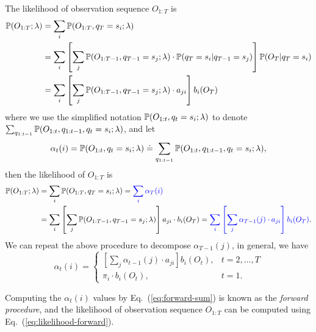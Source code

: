 The likelihood of observation sequence $O_{1:T}$ is
\begin{align*}
\mathbb{P}(O_{1:T} ;\lambda) 
&= \sum_{i} \mathbb{P}(O_{1:T}, q_T = s_i ;\lambda) \\
&= \sum_{i} \left[ \sum_{j} \mathbb{P}(O_{1:T-1}, q_{T-1} = s_j ;\lambda) \cdot \mathbb{P}(q_T = s_i |q_{T-1} = s_j) \right] \mathbb{P}(O_T |q_T = s_i) \\
&= \sum_{i} \left[ \sum_{j} \mathbb{P}(O_{1:T-1}, q_{T-1} = s_j ;\lambda) \cdot a_{ji} \right] b_i(O_T)
\end{align*}
where we use the simplified notation $\mathbb{P}(O_{1:t}, q_t = s_i ;\lambda)$ to denote $\sum_{q_{1:t-1}} \mathbb{P}(O_{1:t}, q_{1:t-1}, q_t = s_i ;\lambda)$,
and let
\begin{equation}
\label{eq:alpha}
\alpha_t(i) = \mathbb{P}(O_{1:t}, q_t = s_i ;\lambda) \doteq \sum_{q_{1:t-1}} \mathbb{P}(O_{1:t}, q_{1:t-1}, q_t = s_i ;\lambda),
\end{equation}
then the likelihood of $O_{1:T}$ is
\begin{alignat}{2}
\mathbb{P}(O_{1:T} ;\lambda) 
&= \sum_{i} \mathbb{P}(O_{1:T}, q_T = s_i ;\lambda) 
 = {\color{blue}{\sum_{i} \alpha_T(i)}}  \label{eq:likelihood-forward} \\
&= \sum_{i} \left[ \sum_{j} \mathbb{P}(O_{1:T-1}, q_{T-1} = s_j ;\lambda) \right] a_{ji} \cdot b_i(O_T) 
 = {\color{blue}{\sum_{i} \left[ \sum_{j} \alpha_{T-1}(j) \cdot a_{ji} \right] b_i(O_T)}}. \nonumber
\end{alignat}
We can repeat the above procedure to decompose $\alpha_{T-1}(j)$, in general, we have
\begin{equation}
\label{eq:forward-sum}
\alpha_t(i) = \begin{cases}
               \left[ \sum_{j} \alpha_{t-1}(j) \cdot a_{ji} \right] b_i(O_t), & t=2,\dots,T \\
               \pi_i \cdot b_i(O_t), & t=1.
              \end{cases}
\end{equation}

Computing the $\alpha_t(i)$ values by Eq.~(\ref{eq:forward-sum}) is known as the \emph{forward procedure}, 
and the likelihood of observation sequence $O_{1:T}$ can be computed using Eq.~(\ref{eq:likelihood-forward}).

